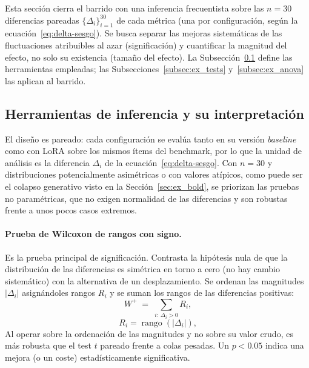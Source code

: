 \documentclass[12pt,a4paper]{report}
\begin{document}
Esta sección cierra el barrido con una inferencia frecuentista sobre las $n=30$ diferencias pareadas $\{\Delta_i\}_{i=1}^{30}$ de cada métrica (una por configuración, según la ecuación~\eqref{eq:delta-sesgo}). Se busca separar las mejoras sistemáticas de las fluctuaciones atribuibles al azar (significación) y cuantificar la magnitud del efecto, no solo su existencia (tamaño del efecto). La Subsección~\ref{subsec:ex_inferencia_def} define las herramientas empleadas; las Subsecciones~\ref{subsec:ex_tests} y~\ref{subsec:ex_anova} las aplican al barrido.

\subsection{Herramientas de inferencia y su interpretación}
\label{subsec:ex_inferencia_def}

El diseño es pareado: cada configuración se evalúa tanto en su versión \textit{baseline} como con LoRA sobre los mismos ítems del benchmark, por lo que la unidad de análisis es la diferencia $\Delta_i$ de la ecuación~\eqref{eq:delta-sesgo}. Con $n=30$ y distribuciones potencialmente asimétricas o con valores atípicos, como puede ser el colapso generativo visto en la Sección~\ref{sec:ex_bold}, se priorizan las pruebas no paramétricas, que no exigen normalidad de las diferencias y son robustas frente a unos pocos casos extremos.

\paragraph{Prueba de Wilcoxon de rangos con signo.} Es la prueba principal de significación. Contrasta la hipótesis nula de que la distribución de las diferencias es simétrica en torno a cero (no hay cambio sistemático) con la alternativa de un desplazamiento. Se ordenan las magnitudes $|\Delta_i|$ asignándoles rangos $R_i$ y se suman los rangos de las diferencias positivas:
\begin{equation}
W^{+} \;=\; \sum_{i:\,\Delta_i>0} R_i\text{,}
\label{eq:wilcoxon}
\end{equation}
\begin{equation}
R_i = \operatorname{rango}(|\Delta_i|)\text{,}
\label{eq:wilcoxon-rank}
\end{equation}
Al operar sobre la ordenación de las magnitudes y no sobre su valor crudo, es más robusta que el test $t$ pareado frente a colas pesadas. Un $p<0.05$ indica una mejora (o un coste) estadísticamente significativa.
\end{document}

